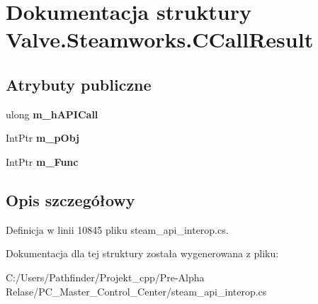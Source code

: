\hypertarget{struct_valve_1_1_steamworks_1_1_c_call_result}{}\section{Dokumentacja struktury Valve.\+Steamworks.\+C\+Call\+Result}
\label{struct_valve_1_1_steamworks_1_1_c_call_result}
\subsection*{Atrybuty publiczne}
\begin{DoxyCompactItemize}
\item 
\mbox{\label{struct_valve_1_1_steamworks_1_1_c_call_result_a347f7fe3b2bc95b32d74dea8a0cd4822}} 
ulong {\bfseries m\+\_\+h\+A\+P\+I\+Call}
\item 
\mbox{\label{struct_valve_1_1_steamworks_1_1_c_call_result_ab614e98ba0d58a49ab7317f6e99fe981}} 
Int\+Ptr {\bfseries m\+\_\+p\+Obj}
\item 
\mbox{\label{struct_valve_1_1_steamworks_1_1_c_call_result_a2012c76fd29c778fba178bfeee9bfc5e}} 
Int\+Ptr {\bfseries m\+\_\+\+Func}
\end{DoxyCompactItemize}


\subsection{Opis szczegółowy}


Definicja w linii 10845 pliku steam\+\_\+api\+\_\+interop.\+cs.



Dokumentacja dla tej struktury została wygenerowana z pliku\+:\begin{DoxyCompactItemize}
\item 
C\+:/\+Users/\+Pathfinder/\+Projekt\+\_\+cpp/\+Pre-\/\+Alpha Relase/\+P\+C\+\_\+\+Master\+\_\+\+Control\+\_\+\+Center/steam\+\_\+api\+\_\+interop.\+cs\end{DoxyCompactItemize}
